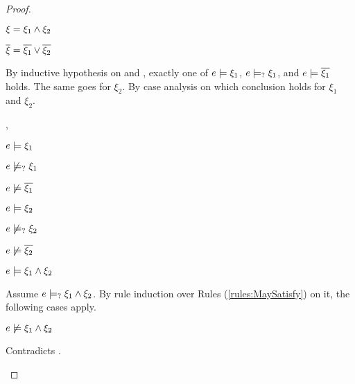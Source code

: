 \begin{proof}
\begin{byCases}
\item[\text{(\ref{rule:CTAnd})}]
    \begin{pfsteps*}
    \item $\xi=\xi_1 \wedge \xi_2$ 
    \item $\overline{\xi}=\overline{\xi_1} \vee \overline{\xi_2}$ 
    \end{pfsteps*}
    By inductive hypothesis on  and , exactly one of $e \models \xi_1$, $e \models_{?} \xi_1$, and $e \models \overline{\xi_1}$ holds. The same goes for $\xi_2$. By case analysis on which conclusion holds for $\xi_1$ and $\xi_2$.
    \begin{byCases}
    \item[\csatisfy{e}{\xi_1},\csatisfy{e}{\xi_2}]
        \begin{pfsteps*}
        \item $e \models \xi_1$  
        \item $e \not\models_{?} \xi_1$  
        \item $e \not\models \overline{\xi_1}$  
        \item $e \models \xi_2$  
        \item $e \not\models_{?} \xi_2$  
        \item $e \not\models \overline{\xi_2}$  
        \item $e \models \xi_1 \wedge \xi_2$  
        \end{pfsteps*}
        Assume $e \models_{?} \xi_1 \wedge \xi_2$. By rule induction over Rules (\ref{rules:MaySatisfy}) on it, the following cases apply.
        \begin{byCases}
        \item[\text{(\ref{rule:CMSNotVal})}]
            \begin{pfsteps*}
            \item $e \not\models \xi_1 \wedge \xi_2$  
            \end{pfsteps*}
            Contradicts .

\end{byCases}
\end{byCases}
\end{byCases}
\end{proof}
